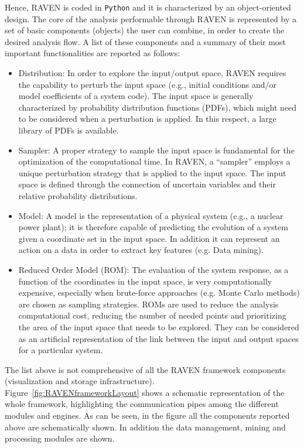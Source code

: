Hence, RAVEN is coded in \texttt{Python} and it is characterized by an object-oriented design. The core of the analysis performable through RAVEN is represented by a set of basic components (objects) the user can combine, in order to create the desired analysis flow. A list of these components and a summary of their most important functionalities are reported as follows:
\begin{itemize}
\item	Distribution: In order to explore the input/output space, RAVEN requires the capability to perturb the input space (e.g., initial conditions and/or model coefficients of a system code). The input space is generally characterized by probability distribution functions (PDFs), which might need to be considered when a perturbation is applied. In this respect, a large library of PDFs is available.
\item Sampler: A proper strategy to sample the input space is fundamental for the optimization of the computational time. In RAVEN, a ``sampler'' employs a unique perturbation strategy that is applied to the input space. The input space is defined through the connection of uncertain variables and their relative probability distributions. 
\item Model: A model is the representation of a physical system (e.g., a nuclear power plant); it is therefore capable of predicting the evolution of a system given a coordinate set in the input space. In addition it can represent an
action on a data in order to extract key features (e.g. Data mining).
\item Reduced Order Model (ROM): The evaluation of the system response, as a function of the coordinates in the input space, is very computationally expensive, especially when brute-force approaches (e.g. Monte Carlo methods) are chosen as sampling strategies. ROMs are used to reduce the analysis computational cost, reducing the number of needed points and prioritizing the area of the input space that needs to be explored. They can be considered as an artificial representation of the link between the input and output spaces for a particular system. 
\end{itemize}
The list above is not comprehensive of all the RAVEN framework components (visualization and storage infrastructure).
\\ Figure~\ref{fig:RAVENframeworkLayout} shows a schematic representation of the whole framework, highlighting the communication pipes among the different modules and engines. As can be seen, in the figure all the components reported above are schematically shown. In addition the data management, mining and processing modules are shown.

